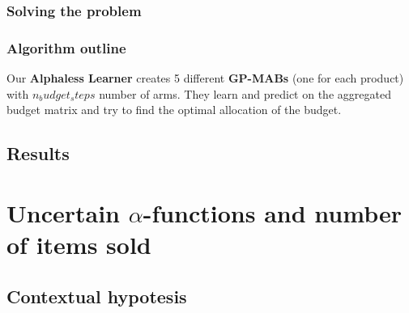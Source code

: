 \documentclass[11pt]{beamer}
\begin{document}
\begin{frame}

\frametitle{Solving the problem}


\end{frame}


\begin{frame}

\frametitle{Algorithm outline}

Our \textbf{Alphaless Learner} creates 5 different \textbf{GP-MABs} (one for each product) with $n_budget_steps$ number of arms.
They learn and predict on the aggregated budget matrix and try to find the optimal allocation of the budget.


\end{frame}


\subsection{Results}


\begin{frame}

\frametitle{}
\framesubtitle{}


\end{frame}


\AtBeginSection[]
{
\begin{frame}{}
    \tableofcontents[sections={\thesection}]
\end{frame}
}


\section{Uncertain $\alpha$-functions and number of items sold}


\subsection{Contextual hypotesis}
\end{document}
